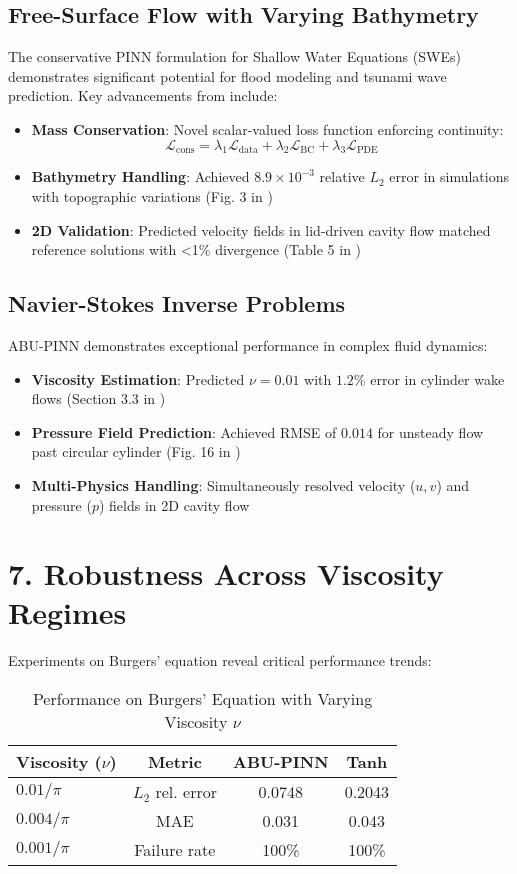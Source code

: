\subsection*{Free-Surface Flow with Varying Bathymetry}
The conservative PINN formulation for Shallow Water Equations (SWEs) demonstrates significant potential for flood modeling and tsunami wave prediction. Key advancements from \cite{free_surface} include:

\begin{itemize}
    \item \textbf{Mass Conservation}: Novel scalar-valued loss function enforcing continuity:
    \[
    \mathcal{L}_{\text{cons}} = \lambda_1\mathcal{L}_{\text{data}} + \lambda_2\mathcal{L}_{\text{BC}} + \lambda_3\mathcal{L}_{\text{PDE}}
    \]
    \item \textbf{Bathymetry Handling}: Achieved \(8.9 \times 10^{-3}\) relative \(L_2\) error in simulations with topographic variations (Fig. 3 in \cite{free_surface})
    \item \textbf{2D Validation}: Predicted velocity fields in lid-driven cavity flow matched reference solutions with <1\% divergence (Table 5 in \cite{abu_pinn})
\end{itemize}

\subsection*{Navier-Stokes Inverse Problems}
ABU-PINN demonstrates exceptional performance in complex fluid dynamics:
\begin{itemize}
    \item \textbf{Viscosity Estimation}: Predicted \(\nu=0.01\) with \(1.2\%\) error in cylinder wake flows (Section 3.3 in \cite{abu_pinn})
    \item \textbf{Pressure Field Prediction}: Achieved RMSE of \(0.014\) for unsteady flow past circular cylinder (Fig. 16 in \cite{abu_pinn})
    \item \textbf{Multi-Physics Handling}: Simultaneously resolved velocity (\(u,v\)) and pressure (\(p\)) fields in 2D cavity flow
\end{itemize}

\section*{7. Robustness Across Viscosity Regimes}
Experiments on Burgers' equation reveal critical performance trends:

\begin{table}[h]
\centering
\caption{Performance on Burgers' Equation with Varying Viscosity \(\nu\)}
\begin{tabular}{l|c|c|c}
\textbf{Viscosity (\(\nu\))} & \textbf{Metric} & \textbf{ABU-PINN} & \textbf{Tanh} \\
\hline
\(0.01/\pi\) & \(L_2\) rel. error & 0.0748 & 0.2043 \\
\(0.004/\pi\) & MAE & 0.031 & 0.043 \\
\(0.001/\pi\) & Failure rate & 100\% & 100\% \\
\end{tabular}
\end{table}

